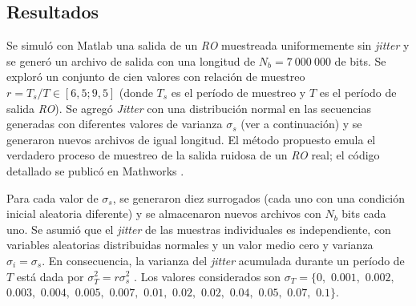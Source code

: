 \subsection{Resultados}
\label{sec:resu}

Se simuló con Matlab una salida de un \emph{RO} muestreada uniformemente sin \textit{jitter} y se generó un archivo de salida con una longitud de $N_b = 7~000~000$ de bits.
Se exploró un conjunto de cien valores con relación de muestreo $r = T_s/T \in [6,5; 9,5]$ (donde $T_s$ es el período de muestreo y $T$ es el período de salida \emph{RO}).
Se agregó \textit{Jitter} con una distribución normal en las secuencias generadas con diferentes valores de varianza $\sigma_s$ (ver a continuación) y se generaron nuevos archivos de igual longitud.
El método propuesto emula el verdadero proceso de muestreo de la salida ruidosa de un \emph{RO} real; el código detallado se publicó en Mathworks \cite{MathworksMaxi}.

Para cada valor de $\sigma_s$, se generaron diez surrogados (cada uno con una condición inicial aleatoria diferente) y se almacenaron nuevos archivos con $N_b$ bits cada uno. Se asumió que el \textit{jitter} de las muestras individuales es independiente, con variables aleatorias distribuidas normales y un valor medio cero y varianza $\sigma_i = \sigma_s$.
En consecuencia, la varianza del \textit{jitter} acumulada durante un período de $T$ está dada por $\sigma^2_T = r \sigma^2_s $ \cite{Valtchanov2008}.
Los valores considerados son $\sigma_T=\{0,$ $0.001,$ $0.002,$ $0.003,$ $0.004,$ $0.005,$ $0.007,$ $0.01,$ $0.02,$ $0.02,$ $0.04,$ $0.05,$ $0.07,$ $0.1\}$.

